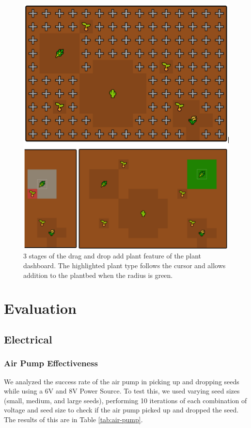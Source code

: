\documentclass{article}
\begin{document}
\begin{figure}[h]
\begin{center}

\includegraphics[width=0.8\linewidth]{figs-demo3/add_plant.png}

\caption{3 stages of the drag and drop add plant feature of the plant dashboard. The highlighted plant type follows the cursor and allows addition to the plantbed when the radius is green.}
\label{fig:add_plant}
\end{center}
\vskip -4mm
\end{figure} 
\vspace{-2mm}
\section{Evaluation}

\subsection{Electrical}

\subsubsection{Air Pump Effectiveness}
We analyzed the success rate of the air pump in picking up and dropping seeds while using a 6V and 8V Power Source. To test this, we used varying seed sizes (small, medium, and large seeds), performing 10 iterations of each combination of voltage and seed size to check if the air pump picked up and dropped the seed. The results of this are in Table \ref{tab:air-pump}.
\end{document}
